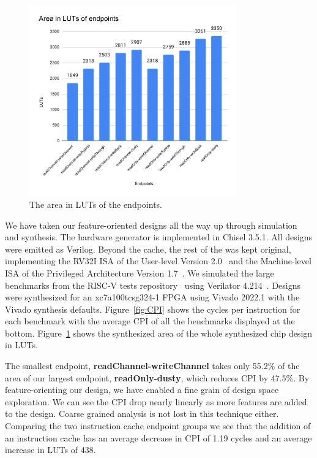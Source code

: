 \documentclass[conference]{IEEEtran}
\begin{document}
\begin{figure}[ht]
    \centering
    \includegraphics[width=0.8\textwidth]{isca2023-latex-template/figures/Area in LUTs of endpoints.pdf}
    \caption{The area in LUTs of the endpoints.}
    \label{fig:area}
\end{figure}

We have taken our feature-oriented designs all the way up through simulation and synthesis. The hardware generator is implemented in Chisel 3.5.1. All designs were emitted as Verilog. Beyond the cache, the rest of the \Riscvmini{} was kept original, implementing the RV32I ISA of the User-level Version 2.0~\cite{riscv:user} and the Machine-level ISA of the Privileged Architecture Version 1.7~\cite{riscv:priv}. We simulated the large benchmarks from the RISC-V tests repository~\cite{RvTest} using Verilator 4.214~\cite{verilator}. Designs were synthesized for an xc7a100tcsg324-1 FPGA using Vivado 2022.1 with the Vivado synthesis defaults. Figure~\ref{fig:CPI} shows the cycles per instruction for each benchmark with the average CPI of all the benchmarks displayed at the bottom. Figure~\ref{fig:area} shows the synthesized area of the whole synthesized chip design in LUTs. 

The smallest endpoint, \textbf{readChannel-writeChannel} takes only 55.2\% of the area of our largest endpoint, \textbf{readOnly-dusty}, which reduces CPI by 47.5\%. By feature-orienting our design, we have enabled a fine grain of design space exploration. We can see the CPI drop nearly linearly as more features are added to the design. Coarse grained analysis is not lost in this technique either. Comparing the two instruction cache endpoint groups we see that the addition of an instruction cache has an average decrease in CPI of 1.19 cycles and an average increase in LUTs of 438. 
\end{document}
